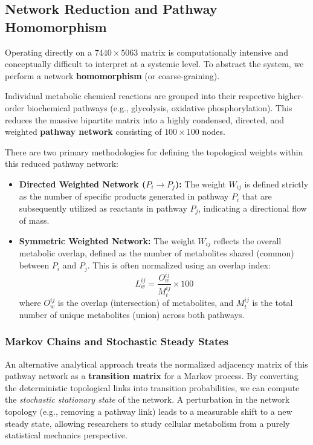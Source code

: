 \subsection{Network Reduction and Pathway Homomorphism}
\label{subsec:pathway_homomorphism}

Operating directly on a \(7440 \times 5063\) matrix is computationally intensive and conceptually difficult to interpret at a systemic level. To abstract the system, we perform a network \textbf{homomorphism} (or coarse-graining).

Individual metabolic chemical reactions are grouped into their respective higher-order biochemical pathways (e.g., glycolysis, oxidative phosphorylation). This reduces the massive bipartite matrix into a highly condensed, directed, and weighted \textbf{pathway network} consisting of \(100 \times 100\) nodes.


There are two primary methodologies for defining the topological weights within this reduced pathway network:
\begin{itemize}
    \item \textbf{Directed Weighted Network (\(P_i \rightarrow P_j\)):} The weight \(W_{ij}\) is defined strictly as the number of specific products generated in pathway \(P_i\) that are subsequently utilized as reactants in pathway \(P_j\), indicating a directional flow of mass.
    \item \textbf{Symmetric Weighted Network:} The weight \(W_{ij}\) reflects the overall metabolic overlap, defined as the number of metabolites shared (common) between \(P_i\) and \(P_j\). This is often normalized using an overlap index:
          \[
              L_w^{ij} = \frac{O_w^{ij}}{M_t^{ij}} \times 100
          \]
          where \(O_w^{ij}\) is the overlap (intersection) of metabolites, and \(M_t^{ij}\) is the total number of unique metabolites (union) across both pathways.
\end{itemize}

\subsubsection{Markov Chains and Stochastic Steady States}

An alternative analytical approach treats the normalized adjacency matrix of this pathway network as a \textbf{transition matrix} for a Markov process. By converting the deterministic topological links into transition probabilities, we can compute the \textit{stochastic stationary state} of the network. A perturbation in the network topology (e.g., removing a pathway link) leads to a measurable shift to a new steady state, allowing researchers to study cellular metabolism from a purely statistical mechanics perspective.

